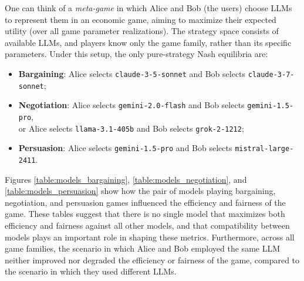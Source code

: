 




One can think of a \emph{meta-game} in which Alice and Bob (the users) choose LLMs to represent them in an economic game, aiming to maximize their expected utility (over all game parameter realizations). The strategy space consists of available LLMs, and players know only the game family, rather than its specific parameters. Under this setup, the only pure-strategy Nash equilibria are: 
\begin{itemize}
    \item \textbf{Bargaining}: Alice selects \texttt{claude-3-5-sonnet} and Bob selects \texttt{claude-3-7-sonnet};
    \item \textbf{Negotiation}: Alice selects \texttt{gemini-2.0-flash} and Bob selects \texttt{gemini-1.5-pro}, \\  or Alice selects \texttt{llama-3.1-405b} and Bob selects \texttt{grok-2-1212};
    \item \textbf{Persuasion}: Alice selects \texttt{gemini-1.5-pro} and Bob selects \texttt{mistral-large-2411}.
\end{itemize}  


Figures \ref{table:models_bargaining}, \ref{table:models_negotiation}, and \ref{table:models_persuasion} show how the pair of models playing bargaining, negotiation, and persuasion games influenced the efficiency and fairness of the game. These tables suggest that there is no single model that maximizes both efficiency and fairness against all other models, and that compatibility between models plays an important role in shaping these metrics. Furthermore, across all game families, the scenario in which Alice and Bob employed the same LLM neither improved nor degraded the efficiency or fairness of the game, compared to the scenario in which they used different LLMs.





